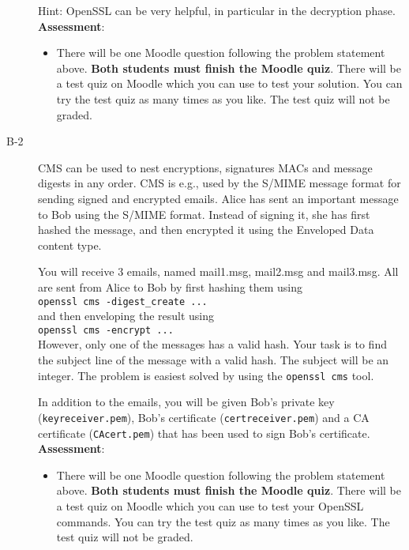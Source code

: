 \documentclass{article}
\begin{document}
\begin{description}
{			Hint: OpenSSL can be very helpful, in particular in the decryption phase.\\
			
			\textbf{Assessment}:
			\begin{itemize}
				\item There will be one Moodle question following the problem statement above. \textbf{Both students must finish the Moodle quiz}.
				There will be a test quiz on Moodle which you can use to test your solution. You can try the test quiz as many times as you like. The test quiz will not be graded.
			\end{itemize}
		}
		
		\item[B-2]{CMS can be used to nest encryptions, signatures MACs and message digests in any order. CMS is e.g., used by the S/MIME message format for sending signed and encrypted emails. Alice has sent an important message to Bob using the S/MIME format. Instead of signing it, she has first hashed the message, and then encrypted it using the Enveloped Data content type.
			
			You will receive 3 emails, named mail1.msg, mail2.msg and mail3.msg. All are sent from Alice to Bob by first hashing them using \\ \texttt{openssl cms -digest\_create ...}\\ and then enveloping the result using \\\texttt{openssl cms -encrypt ...}\\However, only one of the messages has a valid hash. Your task is to find the subject line of the message with a valid hash. The subject will be an integer. The problem is easiest solved by using the \texttt{openssl cms} tool.
			
			In addition to the emails, you will be given Bob's private key (\texttt{keyreceiver.pem}), Bob's certificate (\texttt{certreceiver.pem}) and a CA certificate (\texttt{CAcert.pem}) that has been used to sign Bob's certificate.\\
			\textbf{Assessment}:
			\begin{itemize}
				\item There will be one Moodle question following the problem statement above. \textbf{Both students must finish the Moodle quiz}.
				There will be a test quiz on Moodle which you can use to test your OpenSSL commands. You can try the test quiz as many times as you like. The test quiz will not be graded.
			\end{itemize}}
			

\end{description}
\end{document}
